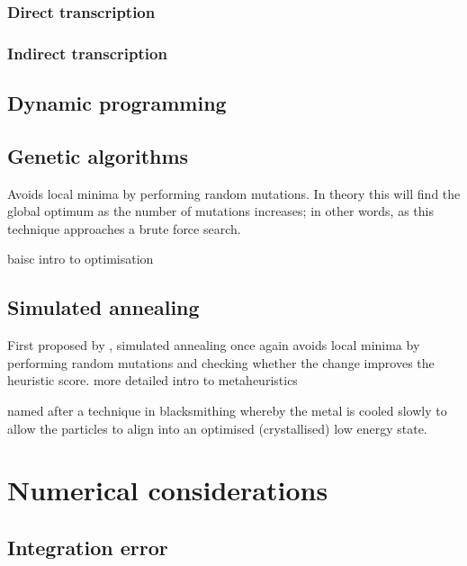 \subsubsection{Direct transcription}
\subsubsection{Indirect transcription}

\subsection{Dynamic programming}

\subsection{Genetic algorithms}

Avoids local minima by performing random mutations. In theory this will find the global optimum as the number of mutations increases; in other words, as this technique approaches a brute force search.

\textcite{Nocedal2006} baisc intro to optimisation

\subsection{Simulated annealing}

First proposed by \textcite{Kirkpatrick1983}, simulated annealing once again avoids local minima by performing random mutations and checking whether the change improves the heuristic score.
\textcite{Dreo2006} more detailed intro to metaheuristics

named after a technique in blacksmithing whereby the metal is cooled slowly to allow the particles to align into an optimised (crystallised) low energy state.

\section{Numerical considerations} \label{sec:Numerical-considerations}

\subsection{Integration error} \label{sub:Integration-error}

